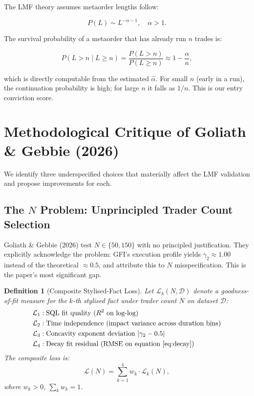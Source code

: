 \documentclass[12pt,a4paper]{article}
\newtheorem{definition}{Definition}
\begin{document}
The LMF theory assumes metaorder lengths follow:

\begin{equation}
  P(L) \sim L^{-\alpha - 1}, \quad \alpha > 1.
  \label{eq:powerlaw}
\end{equation}

\noindent The survival probability of a metaorder that has already run $n$
trades is:

\begin{equation}
  P(L > n \mid L \geq n) = \frac{P(L > n)}{P(L \geq n)}
    \approx 1 - \frac{\alpha}{n},
  \label{eq:survival}
\end{equation}

\noindent which is directly computable from the estimated $\hat{\alpha}$. For
small $n$ (early in a run), the continuation probability is high; for large $n$
it falls as $1/n$. This is our entry conviction score.

\section{Methodological Critique of Goliath \& Gebbie (2026)}
\label{sec:critique}

We identify three underspecified choices that materially affect the LMF
validation and propose improvements for each.

\subsection{The $N$ Problem: Unprincipled Trader Count Selection}

Goliath \& Gebbie (2026) test $N \in \{50, 150\}$ with no principled
justification. They explicitly acknowledge the problem: GFI's execution profile
yields $\gamma_2 \approx 1.00$ instead of the theoretical $\approx 0.5$, and
attribute this to $N$ misspecification. This is the paper's most significant
gap.

\begin{definition}[Composite Stylised-Fact Loss]
Let $\mathcal{L}_k(N, \mathcal{D})$ denote a goodness-of-fit measure for the
$k$-th stylised fact under trader count $N$ on dataset $\mathcal{D}$:
\begin{align*}
  \mathcal{L}_1 &: \text{SQL fit quality (} R^2 \text{ on log-log)} \\
  \mathcal{L}_2 &: \text{Time independence (impact variance across duration bins)} \\
  \mathcal{L}_3 &: \text{Concavity exponent deviation } |\gamma_2 - 0.5| \\
  \mathcal{L}_4 &: \text{Decay fit residual (RMSE on equation~\eqref{eq:decay})}
\end{align*}
The composite loss is:
\begin{equation}
  \mathcal{L}(N) = \sum_{k=1}^{4} w_k \cdot \mathcal{L}_k(N),
  \label{eq:loss}
\end{equation}
where $w_k > 0$, $\sum_k w_k = 1$.
\end{definition}
\end{document}
